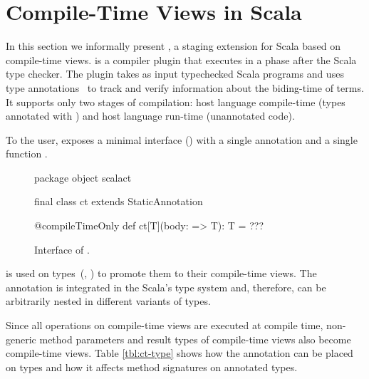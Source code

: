 \section{Compile-Time Views in Scala}
\label{sct:interface}

In this section we informally present \tool, a staging extension for Scala based on compile-time views.
 \tool is a compiler plugin that executes in a phase after the
 Scala type checker. The plugin takes as input typechecked Scala programs and uses
 type annotations~\cite{odersky_1996_putting} to track and verify information about the biding-time
 of terms. It supports only two stages of compilation: host language compile-time
 (types annotated with ) and host language run-time (unannotated code).

To the user, \tool exposes a minimal interface () with
a single annotation  and a single function .

\begin{figure}
\begin{listing}
package object scalact {
  final class ct extends StaticAnnotation

  @compileTimeOnly def ct[T](body: => T): T = ???
}
\end{listing}
\label{fig:interface}
\caption{Interface of \tool.}
\end{figure}

 is used on types~(\eg,
) to promote them to their compile-time views. The
annotation is integrated in the Scala's type system and, therefore, can be
arbitrarily nested in different variants of types.

Since all operations on compile-time views are executed at compile time, non-generic
 method parameters and result types of compile-time views also become compile-time views. Table \ref{tbl:ct-type}
 shows how the  annotation can be placed on types and how it affects method
 signatures on annotated types.

